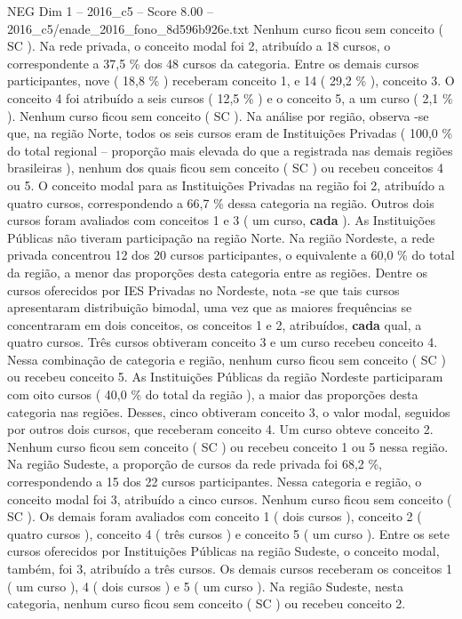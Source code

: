 \begin{textsample}{NEG Dim 1 – 2016\_c5 – Score 8.00 – 2016\_c5/enade\_2016\_fono\_8d596b926e.txt}
Nenhum curso ficou sem conceito ( SC ).
Na rede privada, o conceito modal foi 2, atribuído a 18 cursos, o correspondente a 37,5 \% dos 48 cursos da categoria.
Entre os demais cursos participantes, nove ( 18,8 \% ) receberam conceito 1, e 14 ( 29,2 \% ), conceito 3.
O conceito 4 foi atribuído a seis cursos ( 12,5 \% ) e o conceito 5, a um curso ( 2,1 \% ).
Nenhum curso ficou sem conceito ( SC ).
Na análise por região, observa -se que, na região Norte, todos os seis cursos eram de Instituições Privadas ( 100,0 \% do total regional – proporção mais elevada do que a registrada nas demais regiões brasileiras ), nenhum dos quais ficou sem conceito ( SC ) ou recebeu conceitos 4 ou 5.
O conceito modal para as Instituições Privadas na região foi 2, atribuído a quatro cursos, correspondendo a 66,7 \% dessa categoria na região.
Outros dois cursos foram avaliados com conceitos 1 e 3 ( um curso, \textbf{cada} ).
As Instituições Públicas não tiveram participação na região Norte.
Na região Nordeste, a rede privada concentrou 12 dos 20 cursos participantes, o equivalente a 60,0 \% do total da região, a menor das proporções desta categoria entre as regiões.
Dentre os cursos oferecidos por IES Privadas no Nordeste, nota -se que tais cursos apresentaram distribuição bimodal, uma vez que as maiores frequências se concentraram em dois conceitos, os conceitos 1 e 2, atribuídos, \textbf{cada} qual, a quatro cursos.
Três cursos obtiveram conceito 3 e um curso recebeu conceito 4.
Nessa combinação de categoria e região, nenhum curso ficou sem conceito ( SC ) ou recebeu conceito 5.
As Instituições Públicas da região Nordeste participaram com oito cursos ( 40,0 \% do total da região ), a maior das proporções desta categoria nas regiões.
Desses, cinco obtiveram conceito 3, o valor modal, seguidos por outros dois cursos, que receberam conceito 4.
Um curso obteve conceito 2.
Nenhum curso ficou sem conceito ( SC ) ou recebeu conceito 1 ou 5 nessa região.
Na região Sudeste, a proporção de cursos da rede privada foi 68,2 \%, correspondendo a 15 dos 22 cursos participantes.
Nessa categoria e região, o conceito modal foi 3, atribuído a cinco cursos.
Nenhum curso ficou sem conceito ( SC ).
Os demais foram avaliados com conceito 1 ( dois cursos ), conceito 2 ( quatro cursos ), conceito 4 ( três cursos ) e conceito 5 ( um curso ).
Entre os sete cursos oferecidos por Instituições Públicas na região Sudeste, o conceito modal, também, foi 3, atribuído a três cursos.
Os demais cursos receberam os conceitos 1 ( um curso ), 4 ( dois cursos ) e 5 ( um curso ).
Na região Sudeste, nesta categoria, nenhum curso ficou sem conceito ( SC ) ou recebeu conceito 2.

\end{textsample}
